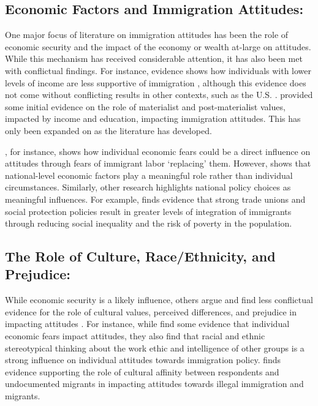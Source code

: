 \documentclass[12pt,]{article}
\begin{document}
\subsection{Economic Factors and Immigration
Attitudes:}\label{economic-factors-and-immigration-attitudes}

One major focus of literature on immigration attitudes has been the role
of economic security and the impact of the economy or wealth at-large on
attitudes. While this mechanism has received considerable attention, it
has also been met with conflictual findings. For instance, evidence
shows how individuals with lower levels of income are less supportive of
immigration \citep{arvanitidis2021, young2018, hoskin1983}, although
this evidence does not come without conflicting results in other
contexts, such as the U.S. \citep{binder1997}. \citet{hoskin1983}
provided some initial evidence on the role of materialist and
post-materialist values, impacted by income and education, impacting
immigration attitudes. This has only been expanded on as the literature
has developed.

\citet{burns2000}, for instance, shows how individual economic fears
could be a direct influence on attitudes through fears of immigrant
labor `replacing' them. However, \citet{hainmueller2014} shows that
national-level economic factors play a meaningful role rather than
individual circumstances. Similarly, other research highlights national
policy choices as meaningful influences. For example,
\citet{artiles2014} finds evidence that strong trade unions and social
protection policies result in greater levels of integration of
immigrants through reducing social inequality and the risk of poverty in
the population.

\subsection{The Role of Culture, Race/Ethnicity, and
Prejudice:}\label{the-role-of-culture-raceethnicity-and-prejudice}

While economic security is a likely influence, others argue and find
less conflictual evidence for the role of cultural values, perceived
differences, and prejudice in impacting attitudes
\citep{heath2020, heath2020a}. For instance, while \citet{burns2000}
find some evidence that individual economic fears impact attitudes, they
also find that racial and ethnic stereotypical thinking about the work
ethic and intelligence of other groups is a strong influence on
individual attitudes towards immigration policy. \citet{espenshade1993}
finds evidence supporting the role of cultural affinity between
respondents and undocumented migrants in impacting attitudes towards
illegal immigration and migrants.
\end{document}
